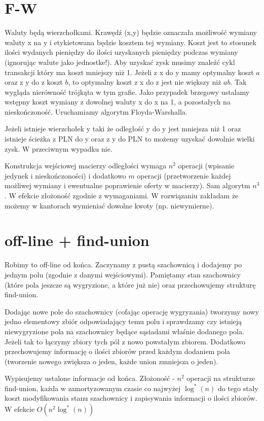 \documentclass[a4paper,12pt]{article}
\begin{document}
\section{F-W}
Waluty będą wierzchołkami. Krawędź (x,y) będzie oznaczała możliwość wymiany waluty x na y i etykietowana będzie kosztem tej wymiany. Koszt jest to stosunek ilości wydanych pieniędzy do ilości uzyskanych pieniędzy podczas wymiany (ignorując walute jako jednostke!). Aby uzyskać zysk musimy znaleźć cykl transakcji który ma koszt mniejszy niż 1. Jeżeli z x do y mamy optymalny koszt $a$ oraz z y do z koszt $b$, to optymalny koszt z x do z jest nie większy niż $ab$. Tak wygląda nierówność trójkąta w tym grafie. Jako przypadek brzegowy ustalamy wstępny koszt wymiany z dowolnej waluty x do x na 1, a pozostałych na nieskończoność. Uruchamiamy algorytm Floyda-Warshalla.

Jeżeli istnieje wierzchołek y taki że odległość y do y jest mniejsza niż 1 oraz istnieje ścieżka z PLN do y oraz z y do PLN to możemy uzyskać dowolnie wielki zysk. W przeciwnym wypadku nie.

Konstrukcja wejściowej macierzy odległości wymaga $n^2$ operacji (wpisanie jedynek i nieskończoności) i dodatkowo $m$ operacji (przetworzenie każdej możliwej wymiany i ewentualne poprawienie oferty w macierzy). Sam algorytm $n^3$. W efekcie złożoność zgodnie z wymaganiami. W rozwiązaniu zakładam że możemy w kantorach wymieniać dowolne kwoty (np. niewymierne).
\section{off-line + find-union}
Robimy to off-line od końca. Zaczynamy z pustą szachownicą i dodajemy po jednym polu (zgodnie z danymi wejściowymi). Pamiętamy stan szachownicy (które pola jeszcze są wygryzione, a które już nie) oraz przechowujemy strukturę find-union.

Dodając nowe pole do szachownicy (cofając operację wygryzania) tworzymy nowy jedno elementowy zbiór odpowiadający temu polu i sprawdzamy czy istnieją niewygryzione pola na szachownicy będące sąsiadami właśnie dodanego pola. Jeżeli tak to łączymy zbiory tych pól z nowo powstałym zbiorem. Dodatkowo przechowujemy informację o ilości zbiorów przed każdym dodaniem pola (tworzenie nowego zwiększa o jeden, każde union zmniejsza o jeden).

Wypisujemy ustalone informacje od końca.
Złożoność - $n^2$ operacji na strukturze find-union, każda w zamortyzowanym czasie co najwyżej $\log^*(n)$ do tego stały koszt modyfikowania stanu szachownicy i zapisywania informacji o ilości zbiorów. W efekcie $O(n^2\log^*(n))$
\end{document}
